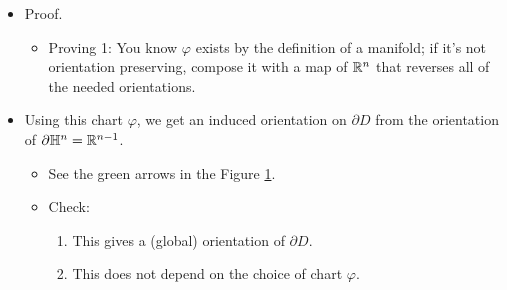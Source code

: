 \documentclass[../notes.tex]{subfiles}
\begin{document}
\begin{itemize}
\begin{figure}[h!]
        \caption{Existence of boundary charts.}
        \label{fig:boundaryCharts}
    \end{figure}
    \begin{itemize}
        \item Consider the two-sphere $S^2\subset\R^3$. We will call this manifold $X$.
        \item The shaded blue circle on the surface of $X$ is a domain $D\subset X$. Its boundary $\partial D$ is represented by a dashed blue line, where dashing is chosen to remind the viewer that $D$ is open. The point $p$ is an element of $\partial D$ and is contained in the open neighborhood $U\subset X$. $X$ is oriented, as indicated. $\varphi$ maps the open disk $U_0\subset\R^2$ to $U$ and such that $\varphi(U_0\cap\mathbb{H}^2)=U\cap D$. Moreover, $\varphi$ is clearly orientation preserving and satisfies $\varphi(0)=p$.
        \item Note that Figure \ref{fig:boundaryCharts} was drawn in a largely analogous manner to Figure \ref{fig:TpX}. See handwritten pages for more info.
    \end{itemize}
    \item Proof.
    \begin{itemize}
        \item Proving 1: You know $\varphi$ exists by the definition of a manifold; if it's not orientation preserving, compose it with a map of $\mathbb{R}^n$ that reverses all of the needed orientations.
    \end{itemize}
    \item Using this chart $\varphi$, we get an induced orientation on $\partial D$ from the orientation of $\partial\mathbb{H}^n=\mathbb{R}^{n-1}$.
    \begin{itemize}
        \item See the green arrows in the Figure \ref{fig:boundaryCharts}.
        \item Check:
        \begin{enumerate}
            \item This gives a (global) orientation of $\partial D$.
            \item This does not depend on the choice of chart $\varphi$.
        \end{enumerate}

\end{itemize}
\end{itemize}
\end{document}
